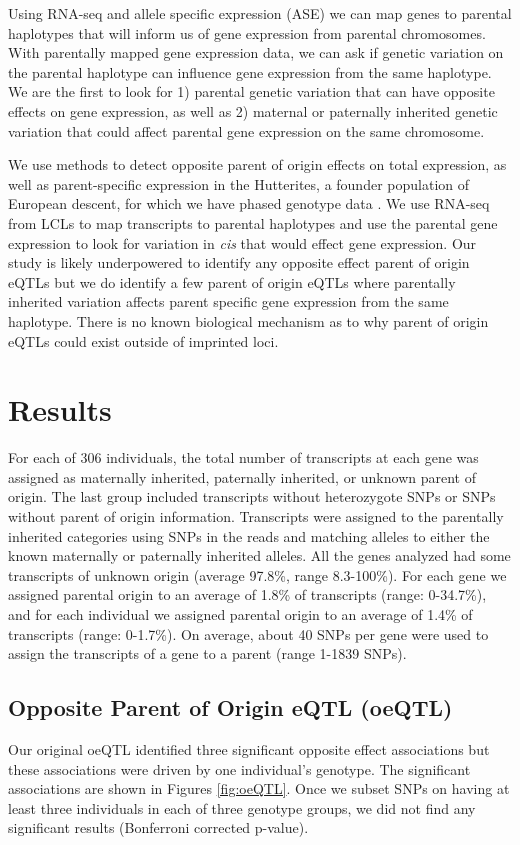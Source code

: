 Using RNA-seq and allele specific expression (ASE) we can map genes to parental haplotypes that will inform us of gene expression from parental chromosomes. With parentally mapped gene expression data, we can ask if genetic variation on the parental haplotype can influence gene expression from the same haplotype.  We are the first to look for 1) parental genetic variation that can have opposite effects on gene expression, as well as 2) maternal or paternally inherited genetic variation that could affect parental gene expression on the same chromosome. 	

We use methods to detect opposite parent of origin effects on total expression, as well as parent-specific expression in the Hutterites, a founder population of European descent, for which we have phased genotype data \cite{Livne2015}. We use RNA-seq from LCLs to map transcripts to parental haplotypes and use the parental gene expression to look for variation in \emph{cis} that would effect gene expression. Our study is likely underpowered to identify any opposite effect parent of origin eQTLs but we do identify a few parent of origin eQTLs where parentally inherited variation affects parent specific gene expression from the same haplotype. There is no known biological mechanism as to why parent of origin eQTLs could exist outside of imprinted loci.

\section{Results}\label{ch04-results}

For each of 306 individuals, the total number of transcripts at each gene was assigned as maternally inherited, paternally inherited, or unknown parent of origin. The last group included transcripts without heterozygote SNPs or SNPs without parent of origin information. Transcripts were assigned to the parentally inherited categories using SNPs in the reads and matching alleles to either the known maternally or paternally inherited alleles. All the genes analyzed had some transcripts of unknown origin (average 97.8\%, range 8.3-100\%). For each gene we assigned parental origin to an average of 1.8\% of transcripts (range: 0-34.7\%), and for each individual we assigned parental origin to an average of 1.4\% of transcripts (range: 0-1.7\%). On average, about 40 SNPs per gene were used to assign the transcripts of a gene to a parent (range 1-1839 SNPs). 


\subsection{Opposite Parent of Origin eQTL (oeQTL) }\label{Opposite Parent of Origin eQTL (oeQTL)} 
Our original oeQTL identified three significant opposite effect associations but these associations were driven by one individual's genotype. The significant associations are shown in Figures \ref{fig:oeQTL}. Once we subset SNPs on having at least three individuals in each of three genotype groups, we did not find any significant results (Bonferroni corrected p-value). 

